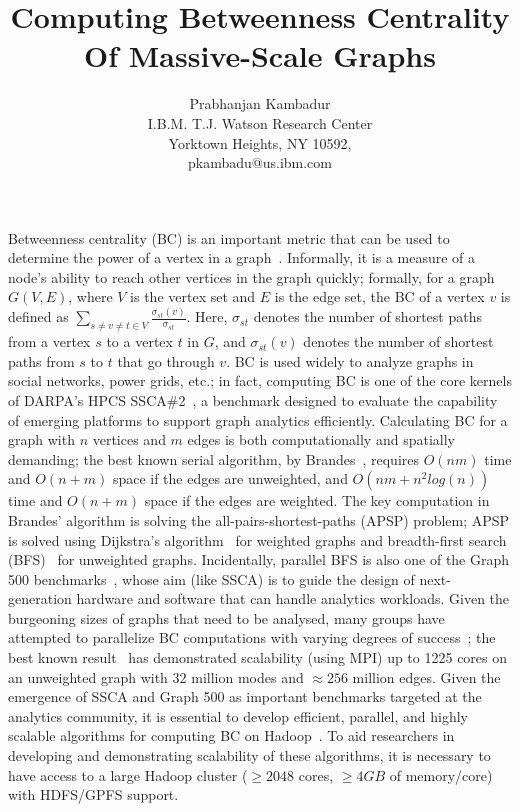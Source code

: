 \documentclass{article}
\begin{document}
%
\title{Computing Betweenness Centrality Of Massive-Scale Graphs}

\author{
Prabhanjan Kambadur \\
I.B.M. T.J. Watson Research Center \\
Yorktown Heights, NY 10592, \\
pkambadu@us.ibm.com}
\date{}

\maketitle

Betweenness centrality (BC) is an important metric that can be used to
determine the power of a vertex in a graph~\cite{Freeman77,Anthonisse71}.
%
Informally, it is a measure of a node's ability to reach other vertices in the
graph quickly; formally, for a graph $G(V,E)$, where $V$ is the vertex set and
$E$ is the edge set, the BC of a vertex $v$ is defined as
$\sum_{s\ne{}v\ne{}t\in{}V}{\frac{\sigma{}_{st}(v)}{\sigma{}_{st}}}$.
%
Here, $\sigma{}_{st}$ denotes the number of shortest paths from a vertex $s$ to
a vertex $t$ in $G$, and $\sigma{}_{st}(v)$ denotes the number of shortest
paths from $s$ to $t$ that go through $v$.
%
BC is used widely to analyze graphs in social networks, power grids, etc.; in
fact, computing BC is one of the core kernels of DARPA's HPCS
SSCA\#2~\cite{ssca_matlab}, a benchmark designed to evaluate the capability of
emerging platforms to support graph analytics efficiently.
%
Calculating BC for a graph with $n$ vertices and $m$ edges is both
computationally and spatially demanding; the best known serial algorithm, by
Brandes~\cite{brandes01:_mathsoc}, requires $O(nm)$ time and $O(n+m)$ space if
the edges are unweighted, and $O(nm+n^2log(n))$ time and $O(n+m)$ space if the
edges are weighted.
%
The key computation in Brandes' algorithm is solving the
all-pairs-shortest-paths (APSP) problem; APSP is solved using Dijkstra's
algorithm~\cite{dijkstra59} for weighted graphs and breadth-first search
(BFS)~\cite{clr90} for unweighted graphs.
%
Incidentally, parallel BFS is also one of the Graph 500
benchmarks~\cite{graph500}, whose aim (like SSCA) is to guide the design of
next-generation hardware and software that can handle analytics workloads.
%
Given the burgeoning sizes of graphs that need to be analysed, many groups have
attempted to parallelize BC computations with varying degrees of
success~\cite{Madduri:2009,Santos:2006,edmonds-hipc-2010,Yang05,buluc-2010};
the best known result~\cite{buluc-2010} has demonstrated scalability (using
MPI) up to 1225 cores on an unweighted graph with $32$ million modes and
$\approx{}256$ million edges.
%
Given the emergence of SSCA and Graph 500 as important benchmarks targeted at
the analytics community, it is essential to develop efficient, parallel, and 
highly scalable algorithms for computing BC on Hadoop~\cite{Hadoop}.
%
To aid researchers in developing and demonstrating scalability of these
algorithms, it is necessary to have access to a large Hadoop cluster
($\ge{}2048{}$ cores, $\ge{}4GB$ of memory/core) with HDFS/GPFS support.





\end{document}
